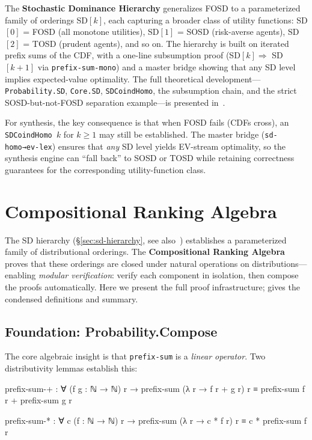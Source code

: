 \documentclass[9pt,a4paper]{article}
\theoremstyle{plain}
\theoremstyle{definition}
\theoremstyle{remark}
\begin{document}
The \textbf{Stochastic Dominance Hierarchy} generalizes FOSD to a parameterized family of orderings SD$[k]$, each capturing a broader class of utility functions: SD$[0]$ = FOSD (all monotone utilities), SD$[1]$ = SOSD (risk-averse agents), SD$[2]$ = TOSD (prudent agents), and so on.  The hierarchy is built on iterated prefix sums of the CDF, with a one-line subsumption proof (SD$[k] \Rightarrow$ SD$[k{+}1]$ via \texttt{prefix-sum-mono}) and a master bridge showing that any SD level implies expected-value optimality.  The full theoretical development---\texttt{Probability.SD}, \texttt{Core.SD}, \texttt{SDCoindHomo}, the subsumption chain, and the strict SOSD-but-not-FOSD separation example---is presented in~\cite{CSHRLSuccessor}.

For synthesis, the key consequence is that when FOSD fails (CDFs cross), an \texttt{SDCoindHomo~$k$} for $k \ge 1$ may still be established.  The master bridge (\texttt{sd-homo→ev-lex}) ensures that \emph{any} SD level yields EV-stream optimality, so the synthesis engine can ``fall back'' to SOSD or TOSD while retaining correctness guarantees for the corresponding utility-function class.

\section{Compositional Ranking Algebra}
\label{sec:compose}

The SD hierarchy (\S\ref{sec:sd-hierarchy}, see also~\cite{CSHRLSuccessor}) establishes a parameterized family of distributional orderings.  The \textbf{Compositional Ranking Algebra} proves that these orderings are closed under natural operations on distributions---enabling \emph{modular verification}: verify each component in isolation, then compose the proofs automatically.  Here we present the full proof infrastructure; \cite{CSHRLSuccessor} gives the condensed definitions and summary.

\subsection{Foundation: Probability.Compose}

The core algebraic insight is that \texttt{prefix-sum} is a \emph{linear operator}.  Two distributivity lemmas establish this:

\begin{spec}
  prefix-sum-+ : ∀ (f g : ℕ → ℕ) r →
    prefix-sum (λ r → f r + g r) r ≡ prefix-sum f r + prefix-sum g r

  prefix-sum-* : ∀ c (f : ℕ → ℕ) r →
    prefix-sum (λ r → c * f r) r ≡ c * prefix-sum f r
\end{spec}
\end{document}
